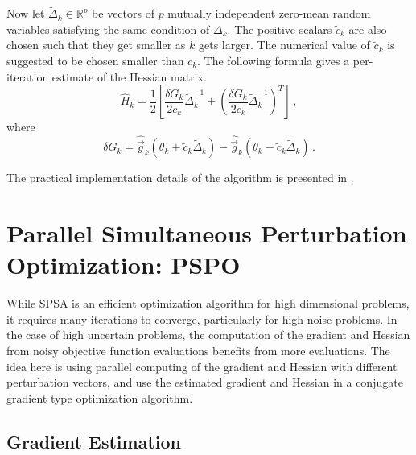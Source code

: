 Now let $\tilde{\Delta}_k \in \mathbb{R}^p$ be vectors of $p$ mutually independent zero-mean random variables satisfying the same condition of $\Delta_k$. The positive scalars $\tilde{c}_k$ are also chosen such that they get smaller as $k$ gets larger. The numerical value of $\tilde{c}_k$ is suggested to be chosen smaller than $c_k$. The following formula gives a per-iteration estimate of the Hessian matrix.
\begin{equation} \label{est_H}
	\hat{H}_k =  \frac{1}{2} \left[ \frac{\delta G_k}{2\tilde{c}_k} \tilde{\Delta}_k^{-1} + \left( \frac{\delta G_k}{2\tilde{c}_k} \tilde{\Delta}_k^{-1} \right)^T \right] \,, 
\end{equation}
where 
\begin{equation} 
	\delta G_k = \hat{\vec{g}}_k(\theta_k + \tilde{c}_k \tilde{\Delta}_k ) - \hat{\vec{g}}_k(\theta_k - \tilde{c}_k \tilde{\Delta}_k ) \,.
\end{equation}

The practical implementation details of the algorithm is presented in \cite{spall2000adaptive}.

\section{Parallel Simultaneous Perturbation Optimization: PSPO}  \label{sec:SPSApp}

While SPSA is an efficient optimization algorithm for high dimensional problems, it requires many iterations to converge, particularly for high-noise problems. In the case of high uncertain problems, the computation of the gradient and Hessian from noisy objective function evaluations benefits from more evaluations.  The idea here is using parallel computing of the gradient and Hessian with different perturbation vectors, and use the estimated gradient and Hessian in a conjugate gradient type optimization algorithm.

\subsection{Gradient Estimation}

